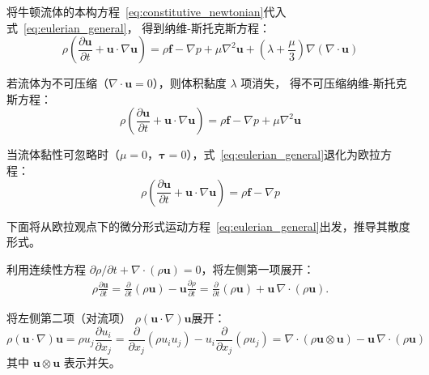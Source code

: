 将牛顿流体的本构方程~\eqref{eq:constitutive_newtonian}代入式~\eqref{eq:eulerian_general}，
得到纳维-斯托克斯方程：
\begin{equation}
\rho \left( \frac{\partial \mathbf{u}}{\partial t} + \mathbf{u}\cdot\nabla \mathbf{u} \right) 
= \rho \mathbf{f} - \nabla p + \mu \nabla^2 \mathbf{u} + \left( \lambda + \frac{\mu}{3} \right)
 \nabla (\nabla\cdot\mathbf{u})
\label{eq:ns_compressible}
\end{equation}

若流体为不可压缩（$\nabla\cdot\mathbf{u}=0$），则体积黏度 $\lambda$ 项消失，
得不可压缩纳维-斯托克斯方程：
\begin{equation}
\rho \left( \frac{\partial \mathbf{u}}{\partial t} + \mathbf{u}\cdot\nabla \mathbf{u} \right) 
= \rho \mathbf{f} - \nabla p + \mu \nabla^2 \mathbf{u}
\label{eq:ns_incompressible}
\end{equation}

当流体黏性可忽略时（$\mu = 0$，$\boldsymbol{\tau} = 0$），式~\eqref{eq:eulerian_general}退化为欧拉方程：
\begin{equation}
\rho \left( \frac{\partial \mathbf{u}}{\partial t} + \mathbf{u}\cdot\nabla \mathbf{u} \right)
 = \rho \mathbf{f} - \nabla p
\label{eq:euler_incompressible}
\end{equation}

下面将从欧拉观点下的微分形式运动方程~\eqref{eq:eulerian_general}出发，推导其散度形式。

利用连续性方程 $\partial\rho/\partial t + \nabla\cdot(\rho\mathbf{u}) = 0$，将左侧第一项展开：
\begin{equation}
\begin{aligned}
    \rho \frac{\partial \mathbf{u}}{\partial t} = \frac{\partial}{\partial t}(\rho \mathbf{u}) - \mathbf{u}\frac{\partial \rho}{\partial t}
= \frac{\partial}{\partial t}(\rho \mathbf{u}) + \mathbf{u}\,\nabla\cdot(\rho\mathbf{u}).
\end{aligned}
\end{equation}

将左侧第二项（对流项） $\rho(\mathbf{u}\cdot\nabla)\mathbf{u}$展开：
\begin{equation}
\rho(\mathbf{u}\cdot\nabla)\mathbf{u} 
= \rho u_j \frac{\partial u_i}{\partial x_j}
= \frac{\partial}{\partial x_j}(\rho u_i u_j) - u_i \frac{\partial}{\partial x_j}(\rho u_j)
= \nabla\cdot(\rho \mathbf{u}\otimes\mathbf{u}) - \mathbf{u}\,\nabla\cdot(\rho\mathbf{u})
\end{equation}
其中 $\mathbf{u}\otimes\mathbf{u}$ 表示并矢。


